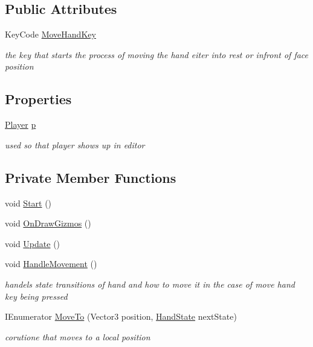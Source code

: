 \subsection*{Public Attributes}
\begin{DoxyCompactItemize}
\item 
Key\+Code \mbox{\hyperlink{class_p_c_player_hand_a4d757a10aeef1d8b06d19687218584f0}{Move\+Hand\+Key}}
\begin{DoxyCompactList}\small\item\em the key that starts the process of moving the hand eiter into rest or infront of face position \end{DoxyCompactList}\end{DoxyCompactItemize}
\subsection*{Properties}
\begin{DoxyCompactItemize}
\item 
\mbox{\hyperlink{class_player}{Player}} \mbox{\hyperlink{class_p_c_player_hand_a8c3efd819803169fc351ce8e456a8a0f}{p}}
\begin{DoxyCompactList}\small\item\em used so that player shows up in editor \end{DoxyCompactList}\end{DoxyCompactItemize}
\subsection*{Private Member Functions}
\begin{DoxyCompactItemize}
\item 
void \mbox{\hyperlink{class_p_c_player_hand_aa3eed40e80c66f9e85905cf2c2c4fcbe}{Start}} ()
\item 
void \mbox{\hyperlink{class_p_c_player_hand_a40a567183ee039605d5778060e5ce17a}{On\+Draw\+Gizmos}} ()
\item 
void \mbox{\hyperlink{class_p_c_player_hand_a1fec11a83fbd674a2a0ff6790704a847}{Update}} ()
\item 
void \mbox{\hyperlink{class_p_c_player_hand_a81d7137403650fb8da125b6356d50496}{Handle\+Movement}} ()
\begin{DoxyCompactList}\small\item\em handels state transitions of hand and how to move it in the case of move hand key being pressed \end{DoxyCompactList}\item 
I\+Enumerator \mbox{\hyperlink{class_p_c_player_hand_a338f6e5898a4953d48c046354ffef9e2}{Move\+To}} (Vector3 position, \mbox{\hyperlink{class_player_hand_a1af76750da713cbc88856161d8d5ac0e}{Hand\+State}} next\+State)
\begin{DoxyCompactList}\small\item\em corutione that moves to a local position \end{DoxyCompactList}\end{DoxyCompactItemize}
